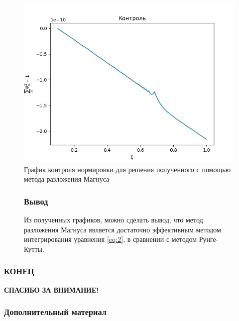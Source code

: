 \documentclass[utf8,9pt,mathserif,usepdftitle=false]{beamer}
\begin{document}
\begin{frame}
	\begin{figure}[h]
		\centering	
		\includegraphics[width=0.8\linewidth]{контроль_магнус}
		\caption{График контроля нормировки для решения полученного с помощью метода разложения Магнуса}
	\end{figure}
\end{frame}

\begin{frame}
	\begin{figure}[h]

	\frametitle{Вывод}
	Из полученных графиков, можно сделать вывод, что метод разложения Магнуса является достаточно эффективным методом интегрирования уравнения \eqref{eq:2}, в сравнении с методом Рунге-Кутты.
	
	\end{figure}
\end{frame}

\begin{frame}
  \frametitle{КОНЕЦ}
  \LARGE\centering\bfseries
  СПАСИБО ЗА ВНИМАНИЕ!
\end{frame}

\begin{frame}
  \frametitle{Дополнительный материал}
\end{frame}
\end{document}
